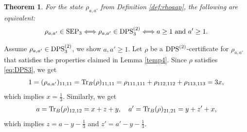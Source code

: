 \documentclass[11pt]{article}
\makeatletter
\newcommand{\SEP}{\text{\rm SEP}}
\newcommand{\DPS}{\text{\rm DPS}}
\newcommand{\Tr}{\text{\rm Tr}}
\theoremstyle{plain}
\newtheorem{theorem}[satz]{Theorem}
\renewenvironment{proof}[1][\proofname]{%
  \par
  \pushQED{}%
  \normalfont
  \topsep6\p@\@plus6\p@
  \trivlist
  \item[\hskip\labelsep\itshape #1\@addpunct{.}]%
}{%
  \popQED
  \endtrivlist
}
\makeatother
\begin{document}
\begin{theorem}\label{theo:rhoaa}
 For the   state $\rho_{a,a'}$ from Definition \ref{def:rhoaap}, the following are equivalent:
 $$\rho_{a,a'}\in \SEP_3\Longleftrightarrow \rho_{a,a'}\in\DPS^{(2)}_3\Longleftrightarrow a\ge 1 \text{ and } a'\ge 1.$$
\end{theorem}
\begin{proof}
 Assume $\rho_{a,a'}\in\DPS^{(2)}_3$, we show $a,a'\ge 1$. Let $\rho$ be a $\DPS^{(2)}$-certificate for $\rho_{a,a'}$ that satisfies the properties claimed in Lemma \ref{temp4}.
     Since $\rho$ satisfies \eqref{eq:DPS3}, we get
    $$1=(\rho_{a,a'})_{11,11}=\Tr_B(\rho)_{11,11}=\rho_{111,111}+\rho_{112,112}+\rho_{113,113}=3x,$$
   which implies    $x=\frac{1}{3}$. Similarly, we get
 \begin{align*}
 a=\Tr_B(\rho)_{12,12}=x+z+y,\quad
a'=\Tr_B(\rho)_{21,21}=y+z'+x,
\end{align*}
 which implies      $z=a-y-\frac{1}{3}$ and $z'=a'-y-\frac{1}{3}$. 
    

\end{proof}
\end{document}
